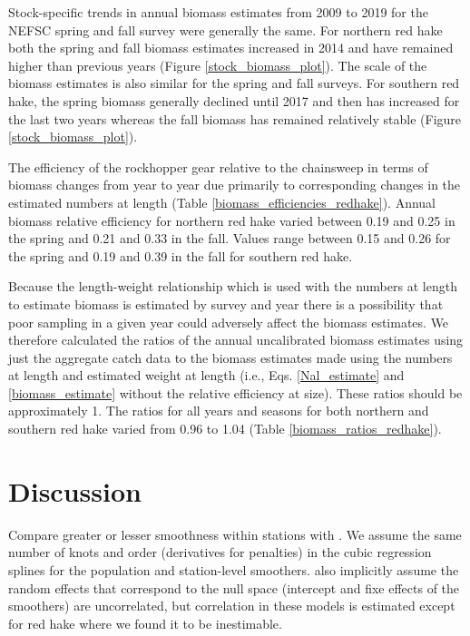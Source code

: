 \documentclass[]{article}
\begin{document}
Stock-specific trends in annual biomass estimates from 2009 to 2019 for
the NEFSC spring and fall survey were generally the same. For northern
red hake both the spring and fall biomass estimates increased in 2014
and have remained higher than previous years (Figure
\ref{stock_biomass_plot}). The scale of the biomass estimates is also
similar for the spring and fall surveys. For southern red hake, the
spring biomass generally declined until 2017 and then has increased for
the last two years whereas the fall biomass has remained relatively
stable (Figure \ref{stock_biomass_plot}).

The efficiency of the rockhopper gear relative to the chainsweep in
terms of biomass changes from year to year due primarily to
corresponding changes in the estimated numbers at length (Table
\ref{biomass_efficiencies_redhake}). Annual biomass relative efficiency
for northern red hake varied between 0.19 and 0.25 in the spring and
0.21 and 0.33 in the fall. Values range between 0.15 and 0.26 for the
spring and 0.19 and 0.39 in the fall for southern red hake.

Because the length-weight relationship which is used with the numbers at
length to estimate biomass is estimated by survey and year there is a
possibility that poor sampling in a given year could adversely affect
the biomass estimates. We therefore calculated the ratios of the annual
uncalibrated biomass estimates using just the aggregate catch data to
the biomass estimates made using the numbers at length and estimated
weight at length (i.e., Eqs. \ref{Nal_estimate} and
\ref{biomass_estimate} without the relative efficiency at size). These
ratios should be approximately 1. The ratios for all years and seasons
for both northern and southern red hake varied from 0.96 to 1.04 (Table
\ref{biomass_ratios_redhake}).

\hypertarget{discussion}{%
\section{Discussion}\label{discussion}}

Compare greater or lesser smoothness within stations with
\citet{pedersenetal19}. We assume the same number of knots and order
(derivatives for penalties) in the cubic regression splines for the
population and station-level smoothers. \citet{pedersenetal19} also
implicitly assume the random effects that correspond to the null space
(intercept and fixe effects of the smoothers) are uncorrelated, but
correlation in these models is estimated except for red hake where we
found it to be inestimable.
\end{document}
